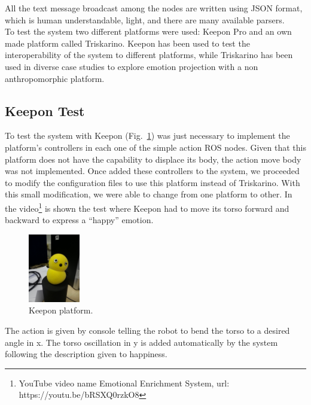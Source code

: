 All the text message broadcast among the nodes are written using JSON format, which is human understandable, light, and there are many available parsers.\\ 
To test the system two different platforms were used: Keepon Pro %
and an own made platform called Triskarino.
Keepon has been used to test the interoperability of the system to different platforms, while Triskarino has been used in diverse case studies to explore emotion projection with a non anthropomorphic platform.
\subsection{Keepon Test}
To test the system with Keepon (Fig.~\ref{fig:keepon}) was just necessary to implement the platform's controllers in each one of the simple action ROS nodes. Given that this platform does not have the capability to displace its body, the action move body was not implemented. Once added these controllers to the system, we proceeded to modify the configuration files to use this platform instead of Triskarino. With this small modification, we were able to change from one platform to other. In the video\footnote{YouTube video name Emotional Enrichment System, url: https://youtu.be/bRSXQ0rzkO8}
is shown the test where Keepon had to move its torso forward and backward to express a ``happy'' emotion. 
\begin{figure}
	\centering
	\includegraphics[width=0.2\textwidth]{./Images/Keepon.jpg}
	\caption{Keepon platform.}
	\label{fig:keepon}
\end{figure} 
The action is given by console telling the robot to bend the torso to a desired angle in x. The torso oscillation in y is added automatically by the system following the description given to happiness. 

